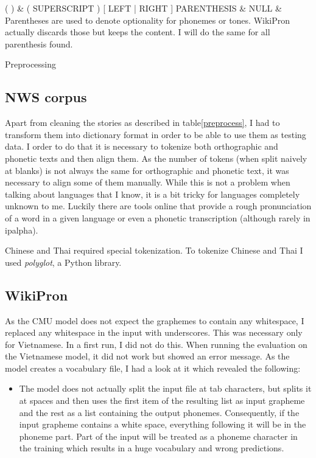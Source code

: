 {\begin{tabularx}{\textwidth}
\hline
( ) 						& \scriptsize{( SUPERSCRIPT ) [ LEFT | RIGHT ] PARENTHESIS}		& NULL							& Parentheses are used to denote optionality for phonemes or tones. WikiPron actually discards those but keeps the content. I will do the same for all parenthesis found.  \\\hline
\end{tabularx}}{Preprocessing}

\subsection*{NWS corpus}
Apart from cleaning the stories as described in table\ref{preprocess}, I had to transform them into dictionary format in order to be able to use them as testing data. I order to do that it is necessary to tokenize both orthographic and phonetic texts and then align them. As the number of tokens (when split naively at blanks) is not always the same for orthographic and phonetic text, it was necessary to align some of them manually. While this is not a problem when talking about languages that I know, it is a bit tricky for languages completely unknown to me. Luckily there are tools online that provide a rough pronunciation of a word in a given language or even a phonetic transcription (although rarely in \ac{ipalpha}). 

Chinese and Thai required special tokenization. To tokenize Chinese and Thai I used \textit{polyglot}, a Python library.


\subsection*{WikiPron} 
As the CMU model does not expect the graphemes to contain any whitespace, I replaced any whitespace in the input with underscores. This was necessary only for Vietnamese. In a first run, I did not do this. When running the evaluation on the Vietnamese model, it did not work but showed an error message. As the model creates a vocabulary file, I had a look at it which revealed the following: 
\begin{itemize}
\item The model does not actually split the input file at tab characters, but splits it at spaces and then uses the first item of the resulting list as input grapheme and the rest as a list containing the output phonemes. Consequently, if the input grapheme contains a white space, everything following it will be in the phoneme part. Part of the input will be treated as a phoneme character in the training which results in a huge vocabulary and wrong predictions.
\end{itemize}

